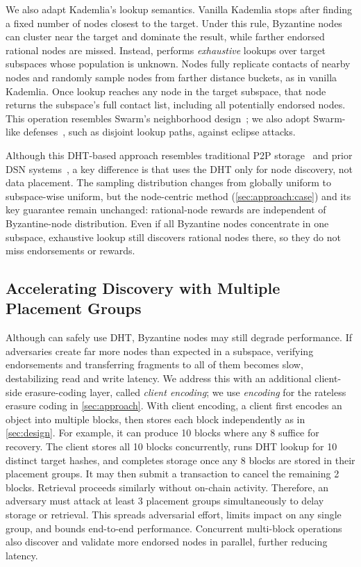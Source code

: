We also adapt Kademlia's lookup semantics.
Vanilla Kademlia stops after finding a fixed number of nodes closest to the target.
Under this rule, Byzantine nodes can cluster near the target and dominate the result, while farther endorsed rational nodes are missed.
Instead, \sys performs \emph{exhaustive} lookups over target subspaces whose population is unknown.
Nodes fully replicate contacts of nearby nodes and randomly sample nodes from farther distance buckets, as in vanilla Kademlia.
Once lookup reaches any node in the target subspace, that node returns the subspace's full contact list, including all potentially endorsed nodes.
This operation resembles Swarm's neighborhood design~\cite{swarm}; we also adopt Swarm-like defenses~\cite{s/kademlia}, such as disjoint lookup paths, against eclipse attacks.
 

Although this DHT-based approach resembles traditional P2P storage~\cite{glacier,oceanstore} and prior DSN systems~\cite{swarm}, a key difference is that \sys uses the DHT only for node discovery, not data placement.
The sampling distribution changes from globally uniform to subspace-wise uniform, but the node-centric method (\cref{sec:approach:case}) and its key guarantee remain unchanged: rational-node rewards are independent of Byzantine-node distribution.
Even if all Byzantine nodes concentrate in one subspace, exhaustive lookup still discovers rational nodes there, so they do not miss endorsements or rewards.

\subsection{Accelerating Discovery with Multiple Placement Groups}
\label{sec:impl:encode}

Although \sys can safely use DHT, Byzantine nodes may still degrade performance.
If adversaries create far more nodes than expected in a subspace, verifying endorsements and transferring fragments to all of them becomes slow, destabilizing read and write latency.
We address this with an additional client-side erasure-coding layer, called \emph{client encoding}; we use \emph{encoding} for the rateless erasure coding in \cref{sec:approach}.
With client encoding, a client first encodes an object into multiple blocks, then stores each block independently as in \cref{sec:design}.
For example, it can produce 10 blocks where any 8 suffice for recovery.
The client stores all 10 blocks concurrently, runs DHT lookup for 10 distinct target hashes, and completes storage once any 8 blocks are stored in their placement groups.
It may then submit a transaction to cancel the remaining 2 blocks.
Retrieval proceeds similarly without on-chain activity.
Therefore, an adversary must attack at least 3 placement groups simultaneously to delay storage or retrieval.
This spreads adversarial effort, limits impact on any single group, and bounds end-to-end performance.
Concurrent multi-block operations also discover and validate more endorsed nodes in parallel, further reducing latency.

